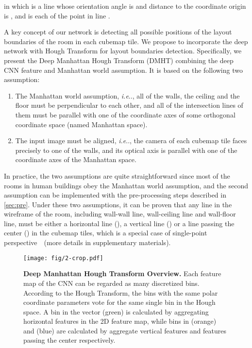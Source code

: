 \documentclass[runningheads]{llncs}
\makeatletter
\DeclareRobustCommand\onedot{\futurelet\@let@token\@onedot}
\def\@onedot{\ifx\@let@token.\else.\null\fi\xspace}
\def\ie{\emph{i.e}\onedot} \def\Ie{\emph{I.e}\onedot}
\makeatother
\begin{document}
in which  is a line whose orientation angle is  and distance to the coordinate origin is , and  is each of the point in line . 

A key concept of our network is detecting all possible positions of the layout boundaries of the room in each cubemap tile.
We propose to incorporate the deep network with Hough Transform for layout boundaries detection. Specifically, we present the Deep Manhattan Hough Transform (DMHT) combining the deep CNN feature and Manhattan world assumption. It is based on the following two assumption: 
\begin{enumerate}
    \item The Manhattan world assumption, \ie, all of the walls, the ceiling and the floor must be perpendicular to each other, and all of the intersection lines of them must be parallel with one of the coordinate axes of some orthogonal coordinate space (named Manhattan space).
    \item The input image must be aligned, \ie, the camera of each cubemap tile faces precisely to one of the walls, and its optical axis is parallel with one of the coordinate axes of the Manhattan space. 
\end{enumerate}

In practice, the two assumptions are quite straightforward since most of the rooms in human buildings obey the Manhattan world assumption, and the second assumption can be implemented with the pre-processing steps described in \cref{sec:pre}. Under these two assumptions, it can be proven that any line in the wireframe of the room, including wall-wall line, wall-ceiling line and wall-floor line, must be either a horizontal line (), a vertical line () or a line passing the center () in the cubemap tiles, which is a special case of single-point perspective~\cite{horry1997tour}~(more details in supplementary materials).
 
\begin{figure}[!h]
	\centering
	\texttt{[image: fig/2-crop.pdf]}
	\caption{\textbf{Deep Manhattan Hough Transform Overview. } Each feature map of the CNN can be regarded as many discretized bins. According to the Hough Transform, the bins with the same polar coordinate parameters vote for the same single bin in the Hough space. A bin in the vector  (green) is calculated by aggregating horizontal features in the 2D feature map, while bins in (orange) and (blue) are calculated by aggregate vertical features and features passing the center respectively.}
	\label{fig:hough} 
\end{figure}
\end{document}
